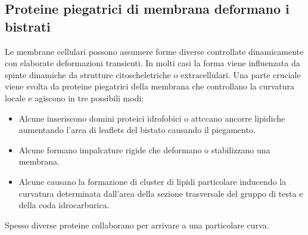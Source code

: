 \subsection{Proteine piegatrici di membrana deformano i bistrati}
Le membrane cellulari possono assumere forme diverse controllate dinamicamente con elaborate deformazioni transienti. In molti casi la forma viene influenzata da spinte dinamiche da
strutture citoscheletriche o extracellulari. Una parte cruciale viene svolta da proteine piegatrici della membrana che controllano la curvatura locale e agiscono in tre possibili modi:
\begin{itemize}
	\item Alcune inseriscono domini proteici idrofobici o attccano ancorre lipidiche aumentando l'area di leaflets del bistato causando il piegamento. 
	\item Alcune formano impalcature rigide che deformano o stabilizzano una membrana.
	\item Alcune causano la formazione di cluster di lipidi particolare inducendo la curvatura determinata dall'area della sezione trasversale del gruppo di testa e della coda
		idrocarburica. 
\end{itemize}
Spesso diverse proteine collaborano per arrivare a una particolare curva.
